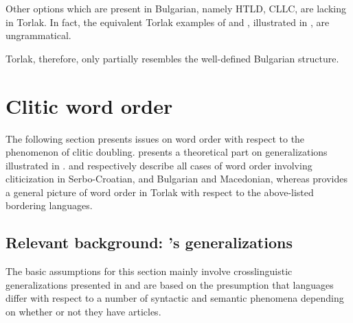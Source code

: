 \documentclass[output=paper,
colorlinks,
citecolor=brown,
newtxmath
]{langscibook}
\begin{document}
\noindent Other options which are present in Bulgarian, namely HTLD, CLLC, are lacking in Torlak. In fact, the equivalent Torlak examples of  and , illustrated in \citet{Cinque.Krapova2008}, are ungrammatical.


\z


\z

\noindent Torlak, therefore, only partially resembles the well-defined Bulgarian structure.
%
%
\section{Clitic word order}
\label{sec:cliticorder}
The following section presents issues on word order with respect to the phenomenon of clitic doubling.  presents a theoretical part on generalizations illustrated in \citet{Boskovic2001,Boskovic2004a,Boskovic2004b,Boskovic2007,Boskovic2016}.  and  respectively describe all cases of word order involving cliticization in Serbo-Croatian, and Bulgarian and Macedonian, whereas  provides a general picture of word order in Torlak with respect to the above-listed bordering languages.

\subsection{Relevant background: \citeauthor{Boskovic2001}'s generalizations}
\label{subsec:assumptions}
The basic assumptions for this section mainly involve crosslinguistic generalizations presented in \citet{Boskovic2001,Boskovic2004a,Boskovic2004b,Boskovic2007,Boskovic2016} and are based on the presumption that languages differ with respect to a number of syntactic and semantic phenomena depending on whether or not they have articles.
\end{document}
